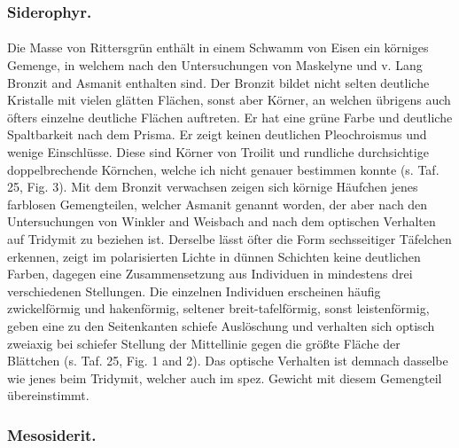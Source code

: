\documentclass[a4paper, 12pt, oneside]{article}
\begin{document}
\subsubsection{Siderophyr.}
\paragraph{}
Die Masse von Rittersgrün enthält in einem Schwamm von Eisen ein körniges Gemenge, in welchem nach den Untersuchungen von Maskelyne und v. Lang Bronzit and Asmanit enthalten sind. Der Bronzit bildet nicht selten deutliche Kristalle mit vielen glätten Flächen, sonst aber Körner, an welchen übrigens auch öfters einzelne deutliche Flächen auftreten. Er hat eine grüne Farbe und deutliche Spaltbarkeit nach dem Prisma. Er zeigt keinen deutlichen Pleochroismus und wenige Einschlüsse. Diese sind Körner von Troilit und rundliche durchsichtige doppelbrechende Körnchen, welche ich nicht genauer bestimmen konnte (s. Taf. 25, Fig. 3). Mit dem Bronzit verwachsen zeigen sich körnige Häufchen jenes farblosen Gemengteilen, welcher Asmanit genannt worden, der aber nach den Untersuchungen von Winkler and Weisbach and nach dem optischen Verhalten auf Tridymit zu beziehen ist. Derselbe lässt öfter die Form sechsseitiger Täfelchen erkennen, zeigt im polarisierten Lichte in dünnen Schichten keine deutlichen Farben, dagegen eine Zusammensetzung aus Individuen in mindestens drei verschiedenen Stellungen. Die einzelnen Individuen erscheinen häufig zwickelförmig und hakenförmig, seltener breit-tafelförmig, sonst leistenförmig, geben eine zu den Seitenkanten schiefe Auslöschung und verhalten sich optisch zweiaxig bei schiefer Stellung der Mittellinie gegen die größte Fläche der Blättchen (s. Taf. 25, Fig. 1 and 2). Das optische Verhalten ist demnach dasselbe wie jenes beim Tridymit, welcher auch im spez. Gewicht mit diesem Gemengteil übereinstimmt.

\subsubsection{Mesosiderit.}
\end{document}
